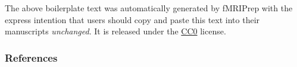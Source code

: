 \documentclass[
]{article}
\begin{document}
The above boilerplate text was automatically generated by fMRIPrep with
the express intention that users should copy and paste this text into
their manuscripts \emph{unchanged}. It is released under the
\href{https://creativecommons.org/publicdomain/zero/1.0/}{CC0} license.

\hypertarget{references}{%
\subsubsection{References}\label{references}}

  
\end{document}
